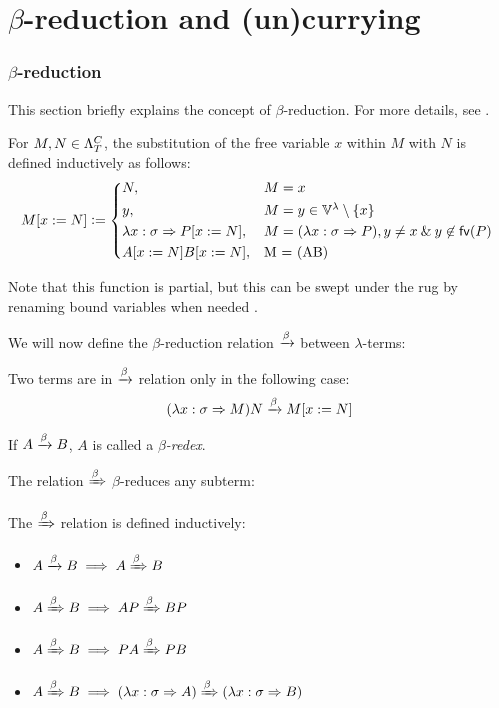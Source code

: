 \documentclass[main.tex]{subfiles}
\begin{document}
\section{$\beta$-reduction and (un)currying}
\label{betacurry}

\subsubsection{$\beta$-reduction}
This section briefly explains the concept of $\beta$-reduction. For more details,
see \cite{pierce}.

\begin{defn}
    For $M, N \in \plambda{T}{C}$, the substitution of the free variable
    $x$ within $M$ with $N$ is defined inductively as follows:
    \[
        \subst{M}{x}{N} \defeq
        \begin{cases*}
            N, & $M = x$ \\
            y, & $M = y \in \lvars \setminus \{ x \}$ \\
            \lambda x : \sigma \abstr \subst{P}{x}{N},
                & $M = (\lambda x : \sigma \abstr P), y \ne x \land y \not\in \fv{P}$ \\
            \subst{A}{x}{N} \subst{B}{x}{N}, & M = (AB) \\
        \end{cases*}
    \]

    Note that this function is partial, but this can be swept under the rug
    by renaming bound variables when needed \cite{pierce}.
\end{defn}

We will now define the $\beta$-reduction relation $\betared$ between $\lambda$-terms:
\begin{defn}
    Two terms are in $\betared$ relation only in the following case:
    \[ (\lambda x : \sigma \abstr M) N \betared \subst{M}{x}{N} \]

    If $A \betared B$, $A$ is called a \emph{$\beta$-redex}.
\end{defn}

The relation $\bbetared$ $\beta$-reduces any subterm:
\begin{defn}
    The $\bbetared$ relation is defined inductively:
    \begin{itemize}
        \item $A \betared B \implies A \bbetared B$
        \item $A \bbetared B \implies AP \bbetared BP$
        \item $A \bbetared B \implies PA \bbetared PB$
        \item $A \bbetared B \implies (\lambda x : \sigma \abstr A)
            \bbetared (\lambda x : \sigma \abstr B)$
    \end{itemize}
\end{defn}
\end{document}
